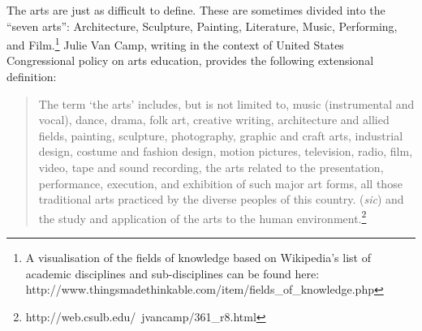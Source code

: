 \documentclass[letterpaper]{article}
\begin{document}

The arts are just as difficult to define.  These are sometimes divided
into the ``seven arts'': Architecture, Sculpture, Painting,
Literature, Music, Performing, and Film.\footnote{A visualisation of
  the fields of knowledge based on Wikipedia's list of academic
  disciplines and sub-disciplines can be found here:
  http://www.thingsmadethinkable.com/item/fields\_of\_knowledge.php}
Julie Van Camp, writing in the context of United States Congressional
policy on arts education, provides the following extensional
definition:

\begin{quote}
  The term `the arts' includes, but is not limited to, music
  (instrumental and vocal), dance, drama, folk art, creative writing,
  architecture and allied fields, painting, sculpture, photography,
  graphic and craft arts, industrial design, costume and fashion
  design, motion pictures, television, radio, film, video, tape and
  sound recording, the arts related to the presentation, performance,
  execution, and exhibition of such major art forms, all those
  traditional arts practiced by the diverse peoples of this
  country. ({\em sic}) and the study and application of the arts to
  the human
  environment.\footnote{http://web.csulb.edu/~jvancamp/361\_r8.html}
\end{quote}



\end{document}
